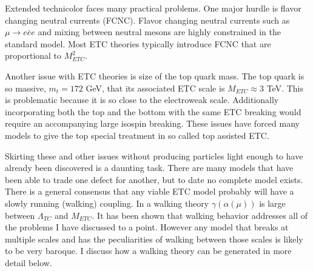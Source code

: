 Extended technicolor faces many practical problems.
One major hurdle is flavor changing neutral currents (FCNC).
Flavor changing neutral currents such as $\mu\rightarrow e\bar{e}e$ and mixing between neutral mesons are highly constrained in the standard model.
Most ETC theories typically introduce FCNC that are proportional to $M^2_{ETC}$.

Another issue with ETC theories is size of the top quark mass.
The top quark is so massive, $m_t=172$ GeV, that its associated ETC scale is $M_{ETC}\approx 3$ TeV.
This is problematic because it is so close to the electroweak scale.
Additionally incorporating both the top and the bottom with the same ETC breaking would require an accompanying large isospin breaking.
These issues have forced many models to give the top special treatment in so called top assisted ETC.

Skirting these and other issues without producing particles light enough to have already been discovered is a daunting task.
There are many models that have been able to trade one defect for another, but to date no complete model exists.
There is a general consensus that any viable ETC model probably will have a slowly running (walking) coupling.
In a walking theory $\gamma(\alpha(\mu))$ is large between $\Lambda_{TC}$ and $M_{ETC}$.
It has been shown that walking behavior addresses all of the problems I have discussed to a point.
However any model that breaks at multiple scales and has the peculiarities of walking between those scales is likely to be very baroque.
I discuss how a walking theory can be generated in more detail below.

